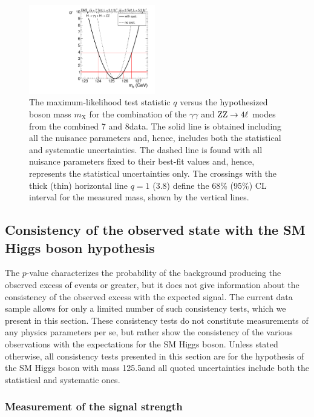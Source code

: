 \documentclass[12pt,twoside,a4paper,cmspaper,final,collab]{cms-tdr}
\begin{document}
\begin{figure}[thbp]
\centering
\includegraphics[width=0.49\textwidth]{figures/comb/sqr_mass_scan_1d_hires_comp}
\caption{
The maximum-likelihood test statistic $q$ versus the  hypothesized boson mass $m_{\mathrm{X}}$
for the combination of the $\gamma \gamma$ and  $\mathrm{Z}\mathrm{Z} \to 4\ell$
modes  from the combined 7 and 8\TeV data.
The solid line is obtained including all the nuisance parameters
and, hence, includes both the statistical and systematic uncertainties.
The dashed line is found with all nuisance parameters fixed to their best-fit values
and, hence, represents the statistical uncertainties only.
The crossings with the thick (thin) horizontal line $q=1$ (3.8) define the 68\% (95\%) CL interval
for the measured mass, shown by the vertical lines.
}
\label{fig:fit_mass_statsyst}
\end{figure}



\subsection{Consistency of the observed state with the SM Higgs boson hypothesis}


The $p$-value characterizes the probability of the background
producing the observed excess of events or greater, but
it does not give information about the consistency of the observed excess
with the expected signal. The current
data sample allows for only a limited number of such consistency tests, which we present in this section.
These consistency tests do not constitute measurements of any physics parameters per se, but rather
show the consistency of the various observations with the expectations for the SM Higgs boson.
Unless stated otherwise, all consistency tests presented in this section are for the hypothesis of the
SM Higgs boson with mass 125.5\GeV and all quoted uncertainties include both the statistical and systematic ones.

\subsubsection{Measurement of the signal strength}
\end{document}
